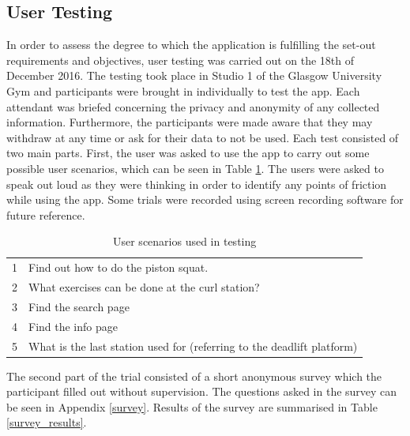 \documentclass{l4proj}
\begin{document}
\subsection{User Testing}
In order to assess the degree to which the application is fulfilling the set-out requirements and objectives, user testing was carried out on the 18th of December 2016. The testing took place in Studio 1 of the Glasgow University Gym and participants were brought in individually to test the app. Each attendant was briefed concerning the privacy and anonymity of any collected information. Furthermore, the participants were made aware that they may withdraw at any time or ask for their data to not be used. Each test consisted of two main parts. First, the user was asked to use the app to carry out some possible user scenarios, which can be seen in Table \ref{test_scenarios}. The users were asked to speak out loud as they were thinking in order to identify any points of friction while using the app. Some trials were recorded using screen recording software for future reference.

\begin{table}[h]
\centering
\caption{User scenarios used in testing}
\label{test_scenarios}
\begin{tabular}{ll}
1 & Find out how to do the piston squat.\\
2 & What exercises can be done at the curl station? \\
3 & Find the search page \\
4 & Find the info page \\
5 & What is the last station used for (referring to the deadlift platform)
\end{tabular}
\end{table}

The second part of the trial consisted of a short anonymous survey which the participant filled out without supervision. The questions asked in the survey can be seen in Appendix \ref{survey}. Results of the survey are summarised in Table \ref{survey_results}.
\end{document}
